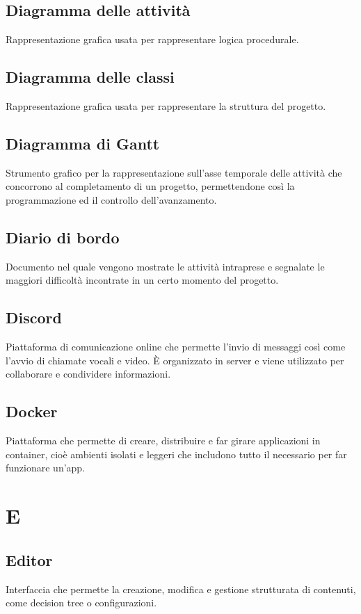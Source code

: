 \documentclass[a4paper,12pt]{article}
\begin{document}
          \subsection*{Diagramma delle attività}
			Rappresentazione grafica usata per rappresentare logica procedurale.
          \subsection*{Diagramma delle classi}
			Rappresentazione grafica usata per rappresentare la struttura del progetto.
          \subsection*{Diagramma di Gantt}
			Strumento grafico per la rappresentazione sull'asse temporale delle attività che concorrono al completamento di un progetto, permettendone così la programmazione ed il controllo dell'avanzamento.
          \subsection*{Diario di bordo}
			Documento nel quale vengono mostrate le attività intraprese e segnalate le maggiori difficoltà incontrate in un certo momento del progetto.
          \subsection*{Discord}
			Piattaforma di comunicazione online che permette l'invio di messaggi così come l'avvio di chiamate vocali e video. È organizzato in server e viene utilizzato per collaborare e condividere informazioni.  
          \subsection*{Docker}
            Piattaforma che permette di creare, distribuire e far girare applicazioni in container, cioè ambienti isolati e leggeri che includono tutto il necessario per far funzionare un'app.
      
     \newpage 
        \section{E}
          
          \subsection*{Editor}
			Interfaccia che permette la creazione, modifica e gestione strutturata di contenuti, come decision tree o configurazioni.
\end{document}
